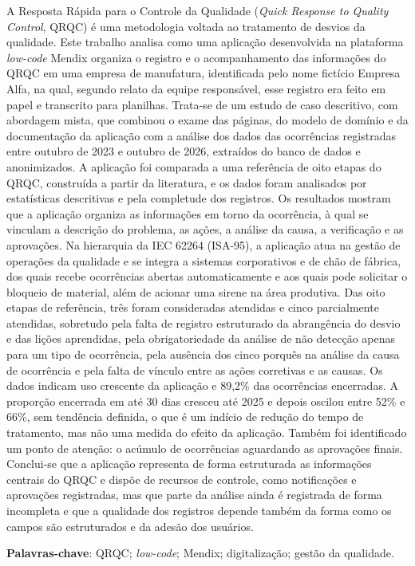 \begin{resumo}
A Resposta Rápida para o Controle da Qualidade (\textit{Quick Response to Quality Control}, QRQC) é uma metodologia voltada ao tratamento de desvios da qualidade. Este trabalho analisa como uma aplicação desenvolvida na plataforma \textit{low-code} Mendix organiza o registro e o acompanhamento das informações do QRQC em uma empresa de manufatura, identificada pelo nome fictício Empresa Alfa, na qual, segundo relato da equipe responsável, esse registro era feito em papel e transcrito para planilhas. Trata-se de um estudo de caso descritivo, com abordagem mista, que combinou o exame das páginas, do modelo de domínio e da documentação da aplicação com a análise dos dados das ocorrências registradas entre outubro de 2023 e outubro de 2026, extraídos do banco de dados e anonimizados. A aplicação foi comparada a uma referência de oito etapas do QRQC, construída a partir da literatura, e os dados foram analisados por estatísticas descritivas e pela completude dos registros. Os resultados mostram que a aplicação organiza as informações em torno da ocorrência, à qual se vinculam a descrição do problema, as ações, a análise da causa, a verificação e as aprovações. Na hierarquia da IEC 62264 (ISA-95), a aplicação atua na gestão de operações da qualidade e se integra a sistemas corporativos e de chão de fábrica, dos quais recebe ocorrências abertas automaticamente e aos quais pode solicitar o bloqueio de material, além de acionar uma sirene na área produtiva. Das oito etapas de referência, três foram consideradas atendidas e cinco parcialmente atendidas, sobretudo pela falta de registro estruturado da abrangência do desvio e das lições aprendidas, pela obrigatoriedade da análise de não detecção apenas para um tipo de ocorrência, pela ausência dos cinco porquês na análise da causa de ocorrência e pela falta de vínculo entre as ações corretivas e as causas. Os dados indicam uso crescente da aplicação e 89,2\% das ocorrências encerradas. A proporção encerrada em até 30 dias cresceu até 2025 e depois oscilou entre 52\% e 66\%, sem tendência definida, o que é um indício de redução do tempo de tratamento, mas não uma medida do efeito da aplicação. Também foi identificado um ponto de atenção: o acúmulo de ocorrências aguardando as aprovações finais. Conclui-se que a aplicação representa de forma estruturada as informações centrais do QRQC e dispõe de recursos de controle, como notificações e aprovações registradas, mas que parte da análise ainda é registrada de forma incompleta e que a qualidade dos registros depende também da forma como os campos são estruturados e da adesão dos usuários.

\textbf{Palavras-chave}: QRQC; \textit{low-code}; Mendix; digitalização; gestão da qualidade.
\end{resumo}

